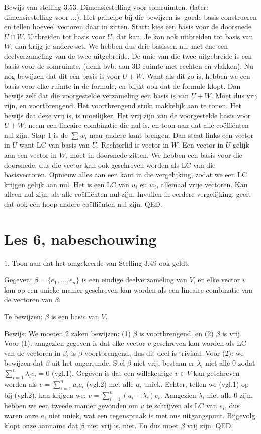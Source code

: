 \documentclass{article}
\begin{document}
Bewijs van stelling 3.53. Dimensiestelling voor somruimten. (later: dimensiestelling voor ...). Het principe bij die bewijzen is: goede basis construeren en tellen hoeveel vectoren daar in zitten. Start: kies een basis voor de doorsnede $U \cap W$. Uitbreiden tot basis voor $U$, dat kan. Je kan ook uitbreiden tot basis van $W$, dan krijg je andere set. We hebben dus drie basissen nu, met ene een deelverzameling van de twee uitgebreide. De unie van die twee uitgebreide is een basis voor de somruimte. (denk bvb. aan 3D ruimte met rechten en vlakken). Nu nog bewijzen dat dit een basis is voor $U+W$. Want als dit zo is, hebben we een basis voor elke ruimte in de formule, en blijkt ook dat de formule klopt. 
Dan bewijs zelf dat die voorgestelde verzameling een basis is van $U+W$. Moet dus vrij zijn, en voortbrengend. Het voortbrengend stuk: makkelijk aan te tonen. Het bewijs dat deze vrij is, is moeilijker. 
Het vrij zijn van de voorgestelde basis voor $U+W$: neem een lineaire combinatie die nul is, en toon aan dat alle co\"effi\"enten nul zijn. Stap 1 is de $\sum w_i$ naar andere kant brengen. Dan staat links een vector in $U$ want LC van basis van $U$. Rechterlid is vector in $W$. Een vector in $U$ gelijk aan een vector in $W$, moet in doorsnede zitten. We hebben een basis voor die doorsnede, dus die vector kan ook geschreven worden als LC van die basisvectoren. Opnieuw alles aan een kant in die vergelijking, zodat we een LC krijgen gelijk aan nul. Het is een LC van $u_i$ en $w_i$, allemaal vrije vectoren. Kan alleen nul zijn, als alle co\"effi\"enten nul zijn. Invullen in eerdere vergelijking, geeft dat ook een hoop andere co\"effi\"enten nul zijn. QED. 

\section{Les 6, nabeschouwing}

1. Toon aan dat het omgekeerde van Stelling 3.49 ook geldt. 

Gegeven: $\beta = \{e_1, \dots , e_n\}$ is een eindige deelverzameling van $V$, en elke vector $v$ kan op een
unieke manier geschreven kan worden als een lineaire combinatie van de vectoren van $\beta$. 

Te bewijzen: $\beta$ is een basis van $V$.

Bewijs: 
We moeten 2 zaken bewijzen:  (1) $\beta$ is voortbrengend, en (2) $\beta$ is vrij. 
Voor (1): aangezien gegeven is dat elke vector $v$ geschreven kan worden als LC van de vectoren in $\beta$, is $\beta$ voortbrengend, dus dit deel is triviaal. Voor (2): we bewijzen dat $\beta$ uit het ongerijmde. Stel $\beta$ niet vrij, bestaan er $\lambda_i$ niet alle $0$ zodat $\sum_{i=1}^n \lambda_i e_i = 0$ (vgl.1). Gegeven is dat een willekeurige $v \in V$ kan geschreven worden als $v=\sum_{i=1}^n a_i e_i$ (vgl.2) met alle $a_i$ uniek. Echter, tellen we (vgl.1) op bij (vgl.2), kan krijgen we: $v=\sum_{i=1}^n (a_i + \lambda_i) e_i $. Aangezien $\lambda_i$ niet alle $0$ zijn, hebben we een tweede manier gevonden om $v$ te schrijven als LC van $e_i$, dus waren onze $a_i$ niet uniek, wat een tegenspraak is met ons uitgangspunt. Bijgevolg klopt onze aanname dat $\beta$ niet vrij is, niet. En dus moet $\beta$ vrij zijn. QED. 
\end{document}

